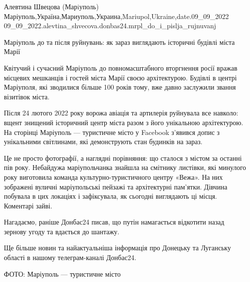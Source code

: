  
 
 
 
 

Алевтина Швецова (Марiуполь)
Маріуполь,Україна,Мариуполь,Украина,Mariupol,Ukraine,date.09_09_2022
09_09_2022.alevtina_shvecova.donbas24.mrpl_do_i_pislja_rujnuvanj

Маріуполь до та після руйнувань: як зараз виглядають історичні будівлі міста Марії 

Квітучий і сучасний Маріуполь до повномасштабного вторгнення росії вражав
місцевих мешканців і гостей міста Марії своєю архітектурою. Будівлі в центрі
Маріуполя, які зводилися більше 100 років тому, вже давно заслужили звання
візитівок міста.

Після 24 лютого 2022 року ворожа авіація та артилерія руйнувала все навколо:
вщент знищений історичний центр міста разом з його унікальною архітектурою. На
сторінці Маріуполь — туристичне місто у Facebook з'явився допис з унікальними
світлинами, які демонструють стан будинків на зараз.

Це не просто фотографії, а наглядні порівняння: що сталося з містом за останні
пів року. Небайдужа маріупольчанка знайшла на смітнику листівки, які минулого
року виготовила команда культурно-туристичного центру «Вежа». На них зображені
вуличні маріупольські пейзажі та архітектурні пам'ятки. Дівчина побувала в цих
локаціях і зафіксувала, як сьогодні виглядають ці місця. Коментарі зайві.

Нагадаємо, раніше Донбас24 писав, що путін намагається відкотити назад зернову угоду та вдається до шантажу.

Ще більше новин та найактуальніша інформація про Донецьку та Луганську області в нашому телеграм-каналі Донбас24.

ФОТО: Маріуполь — туристичне місто
